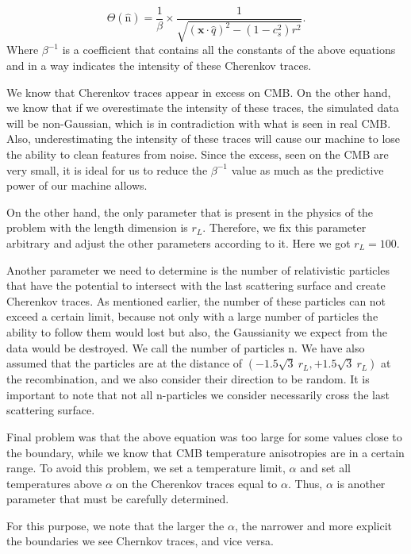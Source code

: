 \documentclass[10pt, english, pra,aps,twocolumn,floatfix,superscriptaddress]{revtex4-2}
\begin{document}
\begin{equation}
    \Theta(\hat{\mathrm{n}}) = \frac{1}{\beta} \times \frac{1}{\sqrt{(\boldsymbol{x} \cdot \hat{q})^{2}-\left(1-c_{s}^{2}\right) r^{2}}}.
\end{equation}
 Where $\beta^{-1}$ is a coefficient that contains all the constants of the above equations and in a way indicates the intensity of these Cherenkov traces.
 
 We know that Cherenkov traces appear in excess on CMB. On the other hand, we know that if we overestimate the intensity of these traces, the simulated data will be non-Gaussian, which is in contradiction with what is seen in real CMB. Also, underestimating the intensity of these traces will cause our machine to lose the ability to clean features from noise. Since the excess, seen on the CMB are very small, it is ideal for us to reduce the $\beta^{-1}$ value as much as the predictive power of our machine allows.
 
 On the other hand, the only parameter that is present in the physics of the problem with the length dimension is $r_L$. Therefore, we fix this parameter arbitrary and adjust the other parameters according to it. Here we got $r_L = 100$.
 
 Another parameter we need to determine is the number of relativistic particles that have the potential to intersect with the last scattering surface and create Cherenkov traces. As mentioned earlier, the number of these particles can not exceed a certain limit, because not only with a large number of particles the ability to follow them would lost but also, the Gaussianity we expect from the data would be destroyed. We call the number of particles n. We have also assumed that the particles are at the distance of $(-1.5\sqrt{3}\:r_L,+1.5\sqrt{3}\:r_L)$ at the recombination, and we also consider their direction to be random. It is important to note that not all n-particles we consider necessarily cross the last scattering surface.
 
 Final problem was that the above equation was too large for some values close to the boundary, while we know that CMB temperature anisotropies are in a certain range. To avoid this problem, we set a temperature limit, $\alpha$ and set all temperatures above $\alpha$ on the Cherenkov traces equal to $\alpha$. Thus, $\alpha$ is another parameter that must be carefully determined.
 
 For this purpose, we note that the larger the $\alpha$, the narrower and more explicit the boundaries we see Chernkov traces, and vice versa.
 
\end{document}
